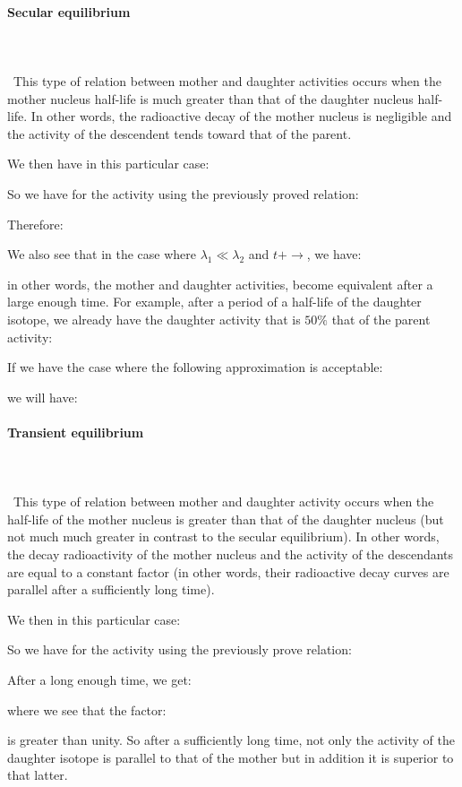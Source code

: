 	\paragraph{Secular equilibrium}\mbox{}\\\\\
	This type of relation between mother and daughter activities occurs when the mother nucleus half-life is much greater than that of the daughter nucleus half-life. In other words, the radioactive decay of the mother nucleus is negligible and the activity of the descendent tends toward that of the parent.

	We then have in this particular case:
	
	So we have for the activity using the previously proved relation:
	
	Therefore:
	
	We also see that in the case where $\lambda_1\ll\lambda_2$ and $t+\rightarrow$, we have:
	
	in other words, the mother and daughter activities, become equivalent after a large enough time. For example, after a period of a half-life of the daughter isotope, we already have the daughter activity that is $50\%$ that of the parent activity:
	
	If we have the case where the following approximation is acceptable:
	
	we will have:
	
	
	\pagebreak
	\paragraph{Transient equilibrium}\mbox{}\\\\\
	This type of relation between mother and daughter activity occurs when the half-life of the mother nucleus is greater than that of the daughter nucleus (but not much much greater in contrast to the secular equilibrium). In other words, the decay radioactivity of the mother nucleus and the activity of the descendants are equal to a constant factor (in other words, their radioactive decay curves are parallel after a sufficiently long time).

	We then in this particular case:
	
	So we have for the activity using the previously prove relation:
	
	After a long enough time, we get:
	
	where we see that the factor:
	
	is greater than unity. So after a sufficiently long time, not only the activity of the daughter isotope is parallel to that of the mother but in addition it is superior to that latter.
	
